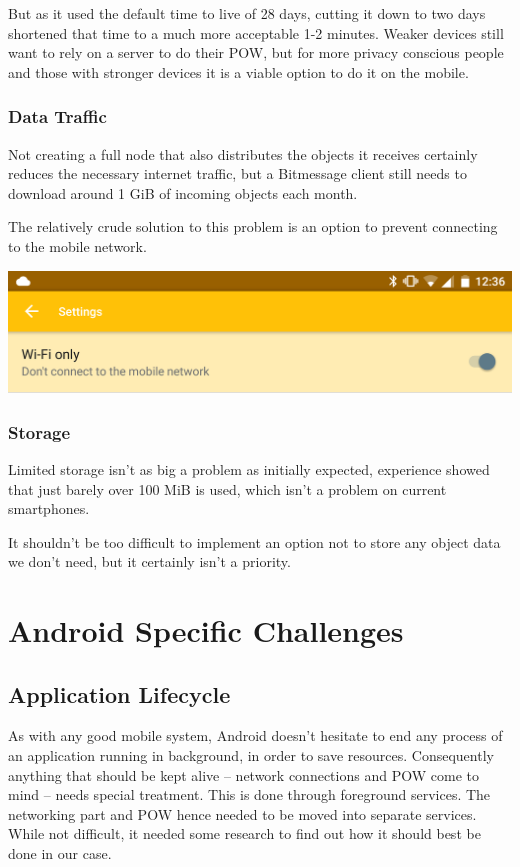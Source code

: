 \documentclass{bfh}
\begin{document}
  But as it used the default time to live of 28 days, cutting it down to two days shortened that time to a much more acceptable 1-2 minutes. Weaker devices still want to rely on a server to do their \ac{POW}, but for more privacy conscious people and those with stronger devices it is a viable option to do it on the mobile.

  \subsubsection{Data Traffic}
  Not creating a full node that also distributes the objects it receives certainly reduces the necessary internet traffic, but a Bitmessage client still needs to download around 1 GiB of incoming objects each month.

  The relatively crude solution to this problem is an option to prevent connecting to the mobile network.

  \begin{center}
    \includegraphics[width=0.8 \textwidth]{images/screenshots/wifi_only_setting.png}
  \end{center}

  \subsubsection{Storage}
  Limited storage isn't as big a problem as initially expected, experience showed that just barely over 100 MiB is used, which isn't a problem on current smartphones.

  It shouldn't be too difficult to implement an option not to store any object data we don't need, but it certainly isn't a priority.


  \newpage
  \section{Android Specific Challenges}
  \subsection{Application Lifecycle}
  As with any good mobile system, Android doesn't hesitate to end any process of an application running in background, in order to save resources. Consequently anything that should be kept alive -- network connections and \ac{POW} come to mind -- needs special treatment. This is done through foreground services. The networking part and \ac{POW} hence needed to be moved into separate services. While not difficult, it needed some research to find out how it should best be done in our case.
\end{document}
